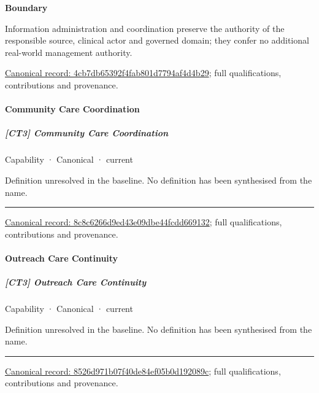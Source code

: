 \textbf{Boundary}



Information administration and coordination preserve the authority of the responsible source, clinical actor and governed domain; they confer no additional real-world management authority.


{\footnotesize \href{../../../../continuum/strategy/capability/4cb7db65392f4fab801d7794af4d4b29.md}{Canonical record: 4cb7db65392f4fab801d7794af4d4b29}; full qualifications, contributions and provenance.}\par
\paragraph{Community Care Coordination}

\subparagraph{[CT3] Community Care Coordination}

\label{element:8c8c6266d9ed43e09dbe44fcdd669132}
{\small Capability · Canonical · current}\par

Definition unresolved in the baseline. No definition has been synthesised from the name.



\medskip\hrule\medskip

{\footnotesize \href{../../../../continuum/strategy/capability/8c8c6266d9ed43e09dbe44fcdd669132.md}{Canonical record: 8c8c6266d9ed43e09dbe44fcdd669132}; full qualifications, contributions and provenance.}\par
\paragraph{Outreach Care Continuity}

\subparagraph{[CT3] Outreach Care Continuity}

\label{element:8526d971b07f40de84ef05b0d192089c}
{\small Capability · Canonical · current}\par

Definition unresolved in the baseline. No definition has been synthesised from the name.



\medskip\hrule\medskip

{\footnotesize \href{../../../../continuum/strategy/capability/8526d971b07f40de84ef05b0d192089c.md}{Canonical record: 8526d971b07f40de84ef05b0d192089c}; full qualifications, contributions and provenance.}\par

